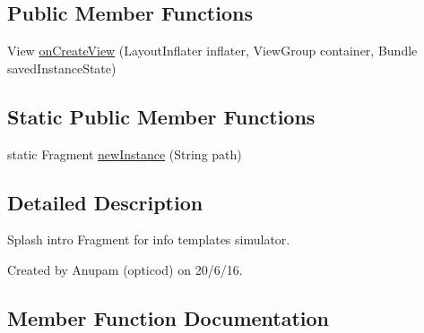 \subsection*{Public Member Functions}
\begin{DoxyCompactItemize}
\item 
View \hyperlink{classorg_1_1buildmlearn_1_1toolkit_1_1infotemplate_1_1fragment_1_1SplashFragment_a40ad80de0ee943ebdfb5404142aa7da1}{on\+Create\+View} (Layout\+Inflater inflater, View\+Group container, Bundle saved\+Instance\+State)
\end{DoxyCompactItemize}
\subsection*{Static Public Member Functions}
\begin{DoxyCompactItemize}
\item 
static Fragment \hyperlink{classorg_1_1buildmlearn_1_1toolkit_1_1infotemplate_1_1fragment_1_1SplashFragment_a056db56270c0ede8c6bc5ff59269e7e4}{new\+Instance} (String path)
\end{DoxyCompactItemize}


\subsection{Detailed Description}
Splash intro Fragment for info template\textquotesingle{}s simulator. 

Created by Anupam (opticod) on 20/6/16. 

\subsection{Member Function Documentation}
